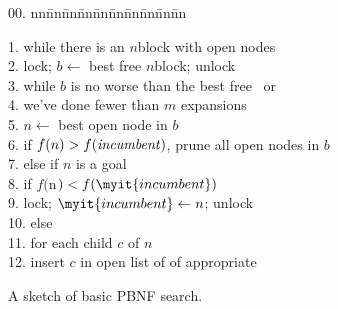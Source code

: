 \documentclass{article}
\newcommand{\bncode}{
  \begin{tabbing}
    00. nn\=nn\=nn\=nn\=nn\=nn\=nn\=nn\=nn\=nn\kill
}
\newcommand{\ecode}{
  \end{tabbing}
}
\begin{document}
\begin{figure}
\bncode
1. while there is an $n$block with open nodes \\
2. \> lock; $b \leftarrow$ best free $n$block; unlock \\
3. \> while $b$ is no worse than the best free \nblock\ or \\
4. \> \> \> we've done fewer than $m$ expansions \\
5. \> \> $n \leftarrow$ best open node in $b$ \\
6. \> \> if $f(n) > f({\it incumbent})$, prune all open nodes in $b$ \\
7. \> \> else if $n$ is a goal \\
8. \> \> \> if $f($n$) < f(\myit{incumbent})$ \\
9. \> \> \> \> lock; $\myit{incumbent} \leftarrow n$; unlock \\
10. \> \> else \\
11. \> \> \> for each child $c$ of $n$ \\
12. \> \> \> \> insert $c$ in open list of of appropriate \nblock \\
\ecode
\caption{A sketch of basic PBNF search.}
\label{alg:pbnfsearch}
\end{figure}
\end{document}
